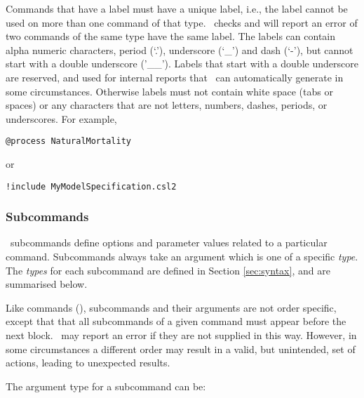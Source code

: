 Commands that have a label must have a unique label, i.e., the label cannot be used on more than one command of that type. \CNAME\ checks and will report an error of two commands of the same type have the same label. The labels can contain alpha numeric characters, period (`.'), underscore (`\_') and dash (`-'), but cannot start with a double underscore ('\_\_'). Labels that start with a double underscore are reserved, and used for internal reports that \CNAME\ can automatically generate in some circumstances. Otherwise labels must not contain white space (tabs or spaces) or any characters that are not letters, numbers, dashes, periods, or underscores. For example,

{\small{\begin{verbatim}
@process NaturalMortality
\end{verbatim}}}
or
{\small{\begin{verbatim}
!include MyModelSpecification.csl2
\end{verbatim}}}

\subsubsection{Subcommands}

\CNAME\ subcommands define options and parameter values related to a particular command. Subcommands always take an argument which is one of a specific \emph{type}. The \emph{types} for each subcommand are defined in Section \ref{sec:syntax}, and are summarised below.

Like commands (), subcommands and their arguments are not order specific, except that that all subcommands of a given command must appear before the next  block. \CNAME\ may report an error if they are not supplied in this way. However, in some circumstances a different order may result in a valid, but unintended, set of actions, leading to unexpected results.

The argument type for a subcommand can be:

